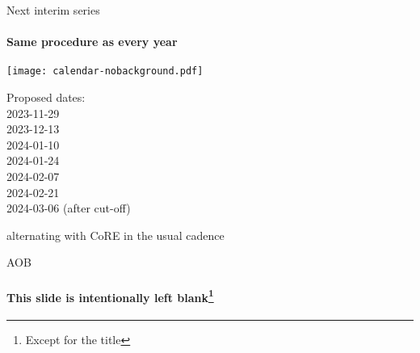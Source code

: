 \documentclass[aspectratio=169]{beamer}
\begin{document}
\begin{frame}{Next interim series}\large
    \framesubtitle{Same procedure as every year}
    \begin{block}{\texttt{[image: calendar-nobackground.pdf]}\mbox{\quad}}
    \end{block}
    \vspace{-2cm}

    Proposed dates:\\
    2023-11-29\\
    2023-12-13\\
    2024-01-10\\
    2024-01-24\\
    2024-02-07\\
    2024-02-21\\
    2024-03-06 (after cut-off)

    \bigskip

    alternating with CoRE in the usual cadence
\end{frame}

\begin{frame}{AOB}\large
    \framesubtitle{This slide is intentionally left blank\footnote{Except for the title}}
\end{frame}
\end{document}
